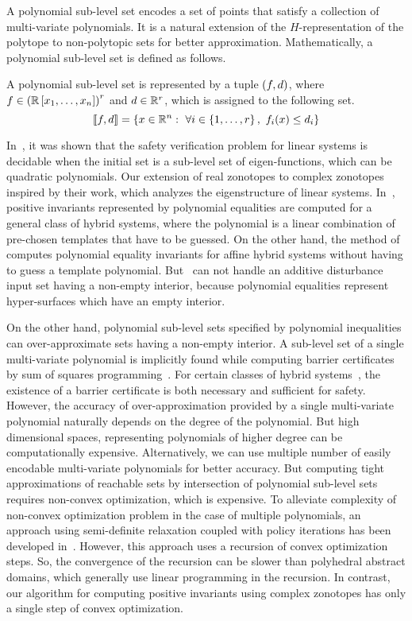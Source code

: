 A polynomial sub-level set encodes a set of points that satisfy
a collection of multi-variate polynomials.  It
is a natural extension of the $H$-representation of the polytope to
non-polytopic sets for better approximation.  Mathematically, a
polynomial sub-level set is defined as follows.
%
\begin{definition}
A polynomial sub-level set is represented by a tuple $\left(f,d\right)$,
where 
$f\in\left(\mathbb{R}\left[x_1,\ldots,x_n\right]\right)^r$ and $d\in\mathbb{R}^r$,
which is assigned to the following set.
%
\[
\left\llbracket f,d\right\rrbracket=\left\{x\in\mathbb{R}^n:~\forall
  i\in\left\{1,\ldots,r\right\},~f_i(x)\leq d_i\right\}
\]
%
\end{definition}
%
In~\cite{duggirala2013safety}, it was shown that the safety
verification problem for linear systems is decidable when the initial
set is a sub-level set of eigen-functions, which can be quadratic
polynomials.  Our extension of real zonotopes to complex zonotopes
inspired by their work, which analyzes the eigenstructure of linear
systems.  In~\cite{Sriram}, positive invariants represented by
polynomial equalities are computed for a general class of hybrid
systems, where the polynomial is a linear combination of pre-chosen
templates that have to be guessed.  On the other hand, the method
of~\cite{tiwariRodriguezCarbonellPolynomialInvariants} computes
polynomial equality invariants for affine hybrid systems without
having to guess a template polynomial.  But~\cite{Sriram,tiwariRodriguezCarbonellPolynomialInvariants}
can not handle an additive disturbance input set having a non-empty
interior, because polynomial equalities represent hyper-surfaces which
have an empty interior.

On the other hand, polynomial sub-level sets specified by polynomial
inequalities can over-approximate sets having a non-empty interior.  A
sub-level set of a single multi-variate polynomial is implicitly found
while computing barrier certificates by sum of squares
programming~\cite{prajna2004safety}.  For certain classes of hybrid
systems~\cite{prajna2005necessity}, the existence of a barrier certificate is both
necessary and sufficient for safety.  However, the accuracy of
over-approximation provided by a single multi-variate polynomial
naturally depends on the degree of the polynomial.  But high
dimensional spaces, representing polynomials of higher degree can be
computationally expensive.  Alternatively, we can use multiple number
of easily encodable multi-variate polynomials for better accuracy.
But computing tight approximations of reachable sets by intersection
of polynomial sub-level sets requires non-convex optimization, which
is expensive.  To alleviate complexity of non-convex optimization
problem in the case of multiple polynomials, an approach using
semi-definite relaxation coupled with policy iterations has been
developed in~\cite{DBLP:conf/esop/AdjeGG10}.  However, this approach
uses a recursion of convex optimization steps.  So, the convergence of
the recursion can be slower than polyhedral abstract domains, which
generally use linear programming in the recursion.  In contrast, our
algorithm for computing positive invariants using complex zonotopes
has only a single step of convex optimization.

